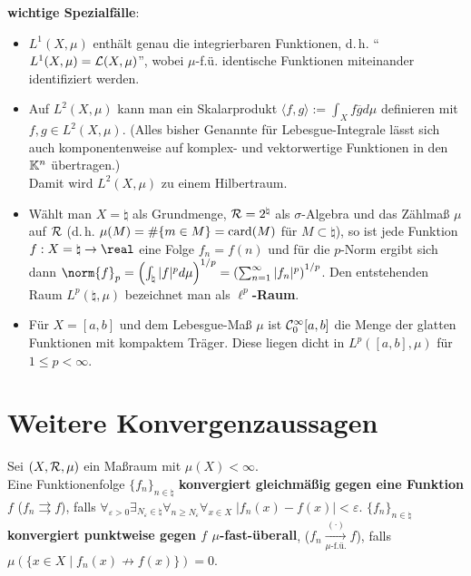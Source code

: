 \textbf{wichtige Spezialfälle}:
\begin{itemize}
    \item
    \textbf{$L^1(X, \mu)$} enthält genau die integrierbaren Funktionen, d.\,h.
    "`$L^1(X, \mu) = \mathcal{L}(X, \mu)$"', wobei $\mu$-f.ü. identische Funktionen
    miteinander identifiziert werden.

    \item
    Auf \textbf{$L^2(X, \mu)$} kann man ein Skalarprodukt
    $\langle f, g \rangle:= \int_X f \overline{g} d\mu$ definieren mit \\
    $f, g \in L^2(X, \mu)$.
    (Alles bisher Genannte für Lebesgue-Integrale lässt sich auch
    komponentenweise auf komplex- und vektorwertige Funktionen in den
    $\mathbb{K}^n$ übertragen.) \\
    Damit wird $L^2(X, \mu)$ zu einem Hilbertraum.

    \item
    Wählt man $X = \natural$ als Grundmenge, $\mathcal{R} = 2^\natural$ als
    $\sigma$-Algebra und das Zählmaß $\mu$ auf $\mathcal{R}$
    (d.\,h. $\mu(M) = \#\{m \in M\} = \operatorname{card}(M)$ für $M \subset \natural$),
    so ist jede Funktion $f: X = \natural \rightarrow \real$ eine Folge
    $f_n = f(n)$ und für die $p$-Norm ergibt sich dann
    $\norm{f}_p = \left(\int_\natural |f|^p d\mu\right)^{1/p} =
    \left(\sum_{n=1}^\infty |f_n|^p\right)^{1/p}$.
    Den entstehenden Raum $L^p(\natural, \mu)$ bezeichnet man
    als \textbf{$\ell^p$-Raum}.

    \item
    Für $X = [a,b]$ und dem Lebesgue-Maß $\mu$ ist \textbf{$\mathcal{C}_0^\infty[a,b]$}
    die Menge der glatten Funktionen mit kompaktem Träger.
    Diese liegen dicht in $L^p([a,b], \mu)$ für $1 \le p < \infty$.
\end{itemize}

\pagebreak

\section{%
    Weitere Konvergenzaussagen%
}

Sei $(X, \mathcal{R}, \mu)$ ein Maßraum mit $\mu(X) < \infty$. \\
Eine Funktionenfolge $\{f_n\}_{n \in \natural}$
\textbf{konvergiert gleichmäßig gegen
eine Funktion $f$} ($f_n \rightrightarrows f$), falls
$\forall_{\varepsilon > 0} \exists_{N_\varepsilon \in \natural}
\forall_{n \ge N_\varepsilon} \forall_{x \in X}\;
|f_n(x) - f(x)| < \varepsilon$.
$\{f_n\}_{n \in \natural}$
\textbf{konvergiert punktweise gegen $f$ $\mu$-fast-überall},
($f_n \xrightarrow[\mu\text{-f.ü.}]{(\cdot)} f$), falls
$\mu(\{x \in X \;|\; f_n(x) \not\to f(x)\}) = 0$.

